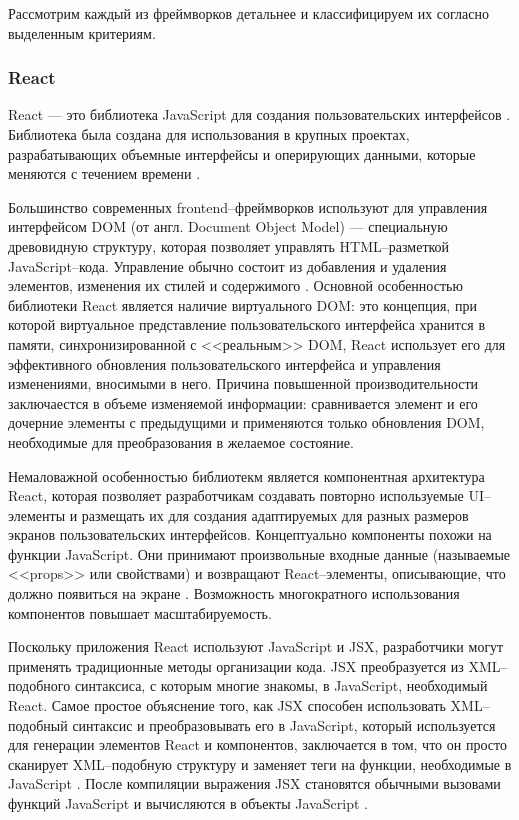 Рассмотрим каждый из фреймворков детальнее и классифицируем их согласно выделенным критериям.


\subsubsection{React} 

React --- это библиотека JavaScript для создания пользовательских интерфейсов \cite{react}. 
Библиотека была создана для использования в крупных проектах, разрабатывающих объемные интерфейсы и оперирующих данными, которые меняются с течением времени \cite{react-doc}.

Большинство современных frontend--фреймворков используют для управления интерфейсом DOM (от англ. Document Object Model) --- специальную древовидную структуру, которая позволяет управлять HTML--разметкой JavaScript--кода. Управление обычно состоит из добавления и удаления элементов, изменения их стилей и содержимого \cite{real-dom}. 
Основной особенностью библиотеки React является наличие виртуального DOM: это концепция, при которой виртуальное представление пользовательского интерфейса хранится в памяти, синхронизированной с <<реальным>> DOM, React использует его для эффективного обновления пользовательского интерфейса и управления изменениями, вносимыми в него. 
Причина повышенной производительности заключаестся в объеме изменяемой информации: сравнивается элемент и его дочерние элементы с предыдущими и применяются только обновления DOM, необходимые для преобразования в желаемое состояние.

Немаловажной особенностью библиотекм является компонентная архитектура React, которая позволяет разработчикам создавать повторно используемые UI--элементы и размещать их для создания адаптируемых для разных размеров экранов пользовательских интерфейсов.
Концептуально компоненты похожи на функции JavaScript. Они принимают произвольные входные данные (называемые <<props>> или свойствами) и возвращают React--элементы, описывающие, что должно появиться на экране \cite{react-doc}.
Возможность многократного использования компонентов повышает масштабируемость.

Поскольку приложения React используют JavaScript и JSX, разработчики могут применять традиционные методы организации кода. 
JSX преобразуется из XML--подобного синтаксиса, с которым многие знакомы, в JavaScript, необходимый React.
Самое простое объяснение того, как JSX способен использовать XML--подобный синтаксис и преобразовывать его в JavaScript, который используется для генерации элементов React и компонентов, заключается в том, что он просто сканирует XML--подобную структуру и заменяет теги на функции, необходимые в JavaScript \cite{react-book}.
После компиляции выражения JSX становятся обычными вызовами функций JavaScript и вычисляются в объекты JavaScript \cite{react-doc}.

